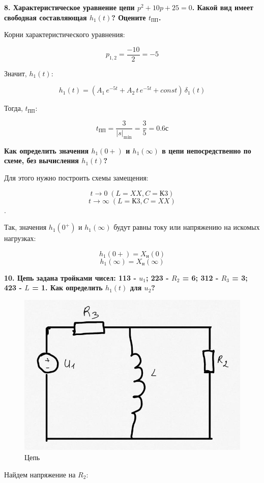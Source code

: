 \textbf{
    8. Характеристическое уравнение цепи 
    $ p^{2} + 10p + 25 = 0 $. 
    Какой вид имеет свободная составляющая $ h_{1}(t) $?
    Оцените $ t_{ПП} $.
}

Корни характеристического уравнения:

$$ p_{1,2} = \dfrac{-10}{2} = -5 $$

Значит, $ h_{1}(t) $:

$$ 
h_{1}(t) = (
A_{1} \, e^{-5t} + 
A_{2} \, t \, e^{-5t} + 
const
) \, \delta_{1}(t) $$

Тогда, $ t_{ПП} $:

$$ t_{ПП} = \dfrac{3}{|s|_{\min}} = \dfrac{3}{5} = 0.6 с $$

\textbf{
    Как определить значения 
    $ h_{1}(0+) $  и  $ h_{1}(\infty) $ 
    в цепи непосредственно по схеме, 
    без вычисления $ h_{1}(t) $?
}

Для этого нужно построить схемы замещения:
 
$$ t \rightarrow 0      \; (L = XX, C = К3) $$
$$ t \rightarrow \infty \; (L = К3, C = XX) $$. 

Так, значения 
$ h_{1}(0^+) $  и  $ h_{1}(\infty) $  
будут равны току или напряжению на 
искомых нагрузках:

$$ h_{1}(0+)     = X_{н}(0)      $$
$$ h_{1}(\infty) = X_{н}(\infty) $$

\textbf{
    10. Цепь задана тройками чисел: 
    113 - $ u_1 $; 
    223 - $ R_2 $ = 6; 
    312 - $ R_3 $ = 3; 
    423 - $ L $ = 1. 
    Как определить $ h_{1}(t) $ для $ u_2 $?
}

\begin{figure}[H]
    \centering
    \includegraphics[width=0.7\linewidth]{photo/q10}
    \caption{Цепь}
    \label{fig:q10}
\end{figure}

Найдем напряжение на $ R_2 $:\\

